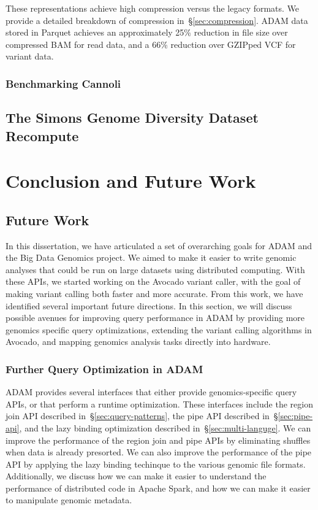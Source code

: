 \documentclass[phd]{ucbthesis}
\begin{document}
These representations achieve high compression versus the legacy formats. We provide a detailed breakdown of
compression in~\S\ref{sec:compression}. {ADAM} data stored in {Parquet} achieves an
approximately 25\% reduction in file size over compressed {BAM} for read data, and a 66\% reduction
over {GZIP}ped {VCF} for variant data.

\section{Benchmarking {Cannoli}}
\label{sec:benchmarking-cannoli}

\chapter{The Simons Genome Diversity Dataset Recompute}
\label{chap:sgdd}

\part{Conclusion and Future Work}

\chapter{Future Work}
\label{chap:future-work}

In this dissertation, we have articulated a set of overarching goals for
{ADAM} and the {Big Data Genomics} project. We aimed to make it
easier to write genomic analyses that could be run on large datasets using
distributed computing. With these APIs, we started working on the
{Avocado} variant caller, with the goal of making variant calling both
faster and more accurate. From this work, we have identified several important
future directions. In this section, we will discuss possible avenues for
improving query performance in {ADAM} by providing more genomics specific
query optimizations, extending the variant calling algorithms in
{Avocado}, and mapping genomics analysis tasks directly into hardware.

\section{Further Query Optimization in {ADAM}}
\label{sec:extensions-adam}

{ADAM} provides several interfaces that either provide genomics-specific
query APIs, or that perform a runtime optimization. These interfaces include the
region join API described in~\S\ref{sec:query-patterns}, the {pipe} API
described in~\S\ref{sec:pipe-api}, and the lazy binding optimization described
in~\S\ref{sec:multi-languge}. We can improve the performance of the region join
and {pipe} APIs by eliminating shuffles when data is already presorted.
We can also improve the performance of the {pipe} API by applying the
lazy binding techinque to the various genomic file formats. Additionally, we
discuss how we can make it easier to understand the performance of distributed
code in {Apache Spark}, and how we can make it easier to manipulate
genomic metadata.
\end{document}
